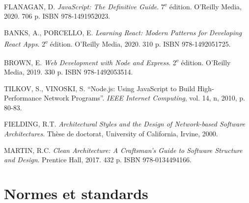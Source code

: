 \begin{enumerate}[label={[\arabic*]}, resume]

\item FLANAGAN, D. \textit{JavaScript: The Definitive Guide}. 7\textsuperscript{e} édition. O'Reilly Media, 2020. 706 p. ISBN 978-1491952023.

\item BANKS, A., PORCELLO, E. \textit{Learning React: Modern Patterns for Developing React Apps}. 2\textsuperscript{e} édition. O'Reilly Media, 2020. 310 p. ISBN 978-1492051725.

\item BROWN, E. \textit{Web Development with Node and Express}. 2\textsuperscript{e} édition. O'Reilly Media, 2019. 330 p. ISBN 978-1492053514.

\item TILKOV, S., VINOSKI, S. ``Node.js: Using JavaScript to Build High-Performance Network Programs''. \textit{IEEE Internet Computing}, vol. 14, n, 2010, p. 80-83.

\item FIELDING, R.T. \textit{Architectural Styles and the Design of Network-based Software Architectures}. Thèse de doctorat, University of California, Irvine, 2000.

\item MARTIN, R.C. \textit{Clean Architecture: A Craftsman's Guide to Software Structure and Design}. Prentice Hall, 2017. 432 p. ISBN 978-0134494166.

\end{enumerate}

\section*{Normes et standards}

